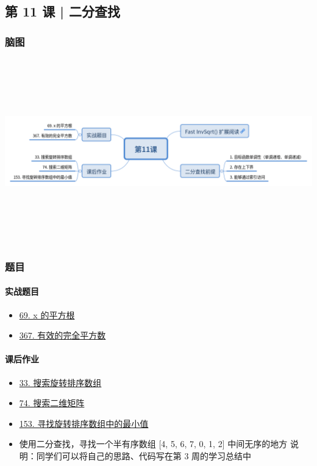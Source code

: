 \subsection{第 11 课 | 二分查找}

\subsubsection{脑图}

\includegraphics[width=170mm,height=80mm]{images/第11课.png}

\subsubsection{题目}

\paragraph{实战题目}

\begin{itemize}
  \item \hyperref[leetcode:69]{69. x 的平方根}
  \item \hyperref[leetcode:367]{367. 有效的完全平方数}
\end{itemize}

\paragraph{课后作业}

\begin{itemize}
  \item \hyperref[leetcode:33]{33. 搜索旋转排序数组}
  \item \hyperref[leetcode:74]{74. 搜索二维矩阵}
  \item \hyperref[leetcode:153]{153. 寻找旋转排序数组中的最小值}
  \item 使用二分查找，寻找一个半有序数组 [4, 5, 6, 7, 0, 1, 2] 中间无序的地方
    说明：同学们可以将自己的思路、代码写在第 3 周的学习总结中
\end{itemize}
